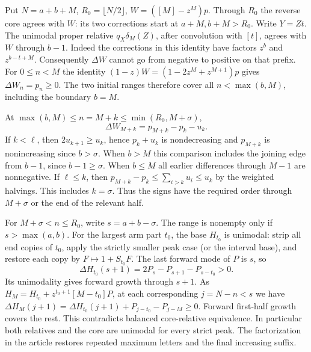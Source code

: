 \documentclass[11pt]{article}
\begin{document}
Put \(N=a+b+M\), \(R_0=\lfloor N/2\rfloor\),
\(W=([M]-z^M)p\). Through \(R_0\) the reverse core agrees with \(W\):
its two corrections start at \(a+M,b+M>R_0\). Write \(Y=Zt\).
The unimodal proper relative \(q_X\delta_M(Z)\), after convolution
with \([t]\), agrees with \(W\) through \(b-1\). Indeed the corrections
in this identity have factors \(z^b\) and \(z^{b-t+M}\).
Consequently \(\Delta W\) cannot go from negative to positive on that
prefix. For \(0\le n<M\) the identity
\((1-z)W=(1-2z^M+z^{M+1})p\) gives \(\Delta W_n=p_n\ge0\).
The two initial ranges therefore cover all \(n<\max(b,M)\), including
the boundary \(b=M\).

At \(\max(b,M)\le n=M+k\le\min(R_0,M+\sigma)\),
\[
 \Delta W_{M+k}=p_{M+k}-p_k-u_k .
\]
If \(k<\ell\), then \(2u_{k+1}\ge u_k\), hence \(p_k+u_k\)
is nondecreasing and \(p_{M+k}\) is nonincreasing since \(b>\sigma\).
When \(b>M\) this comparison includes the joining edge from \(b-1\),
since \(b-1\ge\sigma\). When \(b\le M\) all earlier differences through
\(M-1\) are nonnegative. If \(\ell\le k\),
then \(p_{M+k}-p_k\le\sum_{i>k}u_i\le u_k\) by the weighted
halvings. This includes \(k=\sigma\). Thus the signs have the required
order through \(M+\sigma\) or the end of the relevant half.

For \(M+\sigma<n\le R_0\), write \(s=a+b-\sigma\). The range is
nonempty only if \(s>\max(a,b)\). For the largest arm part \(t_0\),
the base \(H_{t_0}\) is unimodal: strip all end copies of \(t_0\),
apply the strictly smaller peak case (or the interval base), and
restore each copy by \(F\mapsto1+S_{t_0}F\).
The last forward mode of \(P\) is \(s\), so
\[
 \Delta H_{t_0}(s+1)=2P_s-P_{s+1}-P_{s-t_0}>0.
\]
Its unimodality gives forward growth through \(s+1\). As
\(H_M=H_{t_0}+z^{t_0+1}[M-t_0]P\), at each corresponding \(j=N-n<s\)
we have \(\Delta H_M(j+1)=\Delta H_{t_0}(j+1)+P_{j-t_0}-P_{j-M}\ge0\).
Forward first-half growth covers the rest. This contradicts balanced
core-relative equivalence. In particular both relatives and the core
are unimodal for every strict peak. The factorization in the article
restores repeated maximum letters and the final increasing suffix.
\end{document}

